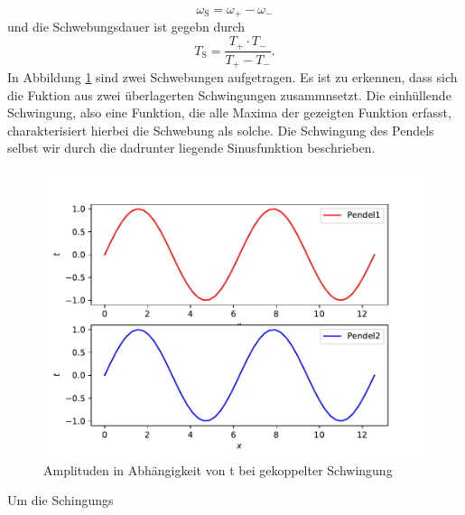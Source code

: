 \begin{enumerate}
        \begin{equation}
            \omega_\text{S}=\omega_+ - \omega_-
        \end{equation}
        und die Schwebungsdauer ist gegebn durch
        \begin{equation}
            T_\text{S}=\frac{T_+\cdot T_-}{T_+-T_-}.
        \end{equation}
        In Abbildung \ref{fig:gekoppelt} sind zwei Schwebungen aufgetragen. Es ist zu erkennen, dass sich die Fuktion aus zwei überlagerten Schwingungen zusammnsetzt.
        Die einhüllende Schwingung, also eine Funktion, die alle Maxima der gezeigten Funktion erfasst, charakterisiert hierbei die Schwebung als solche. Die Schwingung
        des Pendels selbst wir durch die dadrunter liegende Sinusfunktion beschrieben.
            \begin{figure}
            \centering
            \includegraphics[scale = 0.5]{gleichsinnig.pdf}
            \caption{Amplituden in Abhängigkeit von t bei gekoppelter Schwingung}
            \label{fig:gekoppelt}
        \end{figure}
    Um die Schingungs %
\end{enumerate}